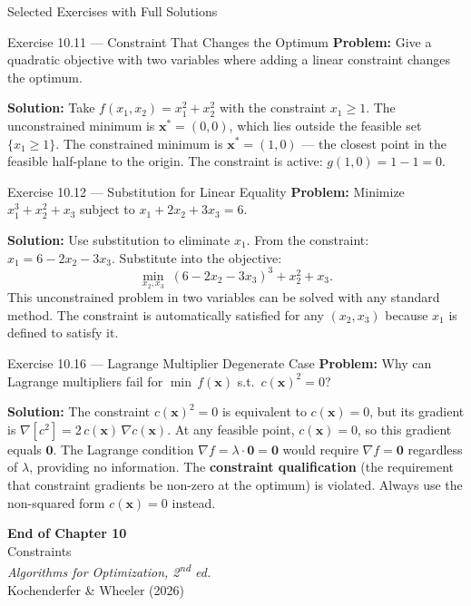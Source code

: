 \documentclass[aspectratio=169,10pt]{beamer}
\newcommand{\bx}{\mathbf{x}}
\begin{document}
\begin{frame}[allowframebreaks]{Selected Exercises with Full Solutions}
  \begin{block}{Exercise 10.11 --- Constraint That Changes the Optimum}
    \textbf{Problem:} Give a quadratic objective with two variables where adding
    a linear constraint changes the optimum.

    \medskip
    \textbf{Solution:}  Take $f(x_1, x_2) = x_1^2 + x_2^2$ with the constraint
    $x_1 \ge 1$.  The unconstrained minimum is $\bx^* = (0, 0)$, which lies
    outside the feasible set $\{x_1 \ge 1\}$.  The constrained minimum is
    $\bx^* = (1, 0)$ --- the closest point in the feasible half-plane to the
    origin.  The constraint is active: $g(1, 0) = 1 - 1 = 0$.
  \end{block}

  \framebreak

  \begin{block}{Exercise 10.12 --- Substitution for Linear Equality}
    \textbf{Problem:} Minimize $x_1^3 + x_2^2 + x_3$ subject to
    $x_1 + 2x_2 + 3x_3 = 6$.

    \medskip
    \textbf{Solution:}  Use substitution to eliminate $x_1$.  From the
    constraint: $x_1 = 6 - 2x_2 - 3x_3$.  Substitute into the objective:
    \[
      \min_{x_2, x_3}\; (6 - 2x_2 - 3x_3)^3 + x_2^2 + x_3.
    \]
    This unconstrained problem in two variables can be solved with any standard
    method.  The constraint is automatically satisfied for any $(x_2, x_3)$
    because $x_1$ is defined to satisfy it.
  \end{block}

  \begin{block}{Exercise 10.16 --- Lagrange Multiplier Degenerate Case}
    \textbf{Problem:} Why can Lagrange multipliers fail for
    $\min\, f(\bx)$ s.t.\ $c(\bx)^2 = 0$?

    \medskip
    \textbf{Solution:}  The constraint $c(\bx)^2 = 0$ is equivalent to
    $c(\bx) = 0$, but its gradient is
    $\nabla[c^2] = 2\,c(\bx)\,\nabla c(\bx)$.  At any feasible point,
    $c(\bx) = 0$, so this gradient equals $\mathbf{0}$.  The Lagrange condition
    $\nabla f = \lambda \cdot \mathbf{0} = \mathbf{0}$ would require $\nabla f = \mathbf{0}$
    regardless of $\lambda$, providing no information.  The \textbf{constraint
    qualification} (the requirement that constraint gradients be non-zero at the
    optimum) is violated.  Always use the non-squared form $c(\bx) = 0$ instead.
  \end{block}

\end{frame}

\begin{frame}{}
  \begin{center}
    \vspace{2em}
    {\Large\textbf{End of Chapter 10}}\\[1em]
    {\large Constraints}\\[2em]
    \textit{Algorithms for Optimization, 2\textsuperscript{nd} ed.}\\
    Kochenderfer \& Wheeler (2026)
  \end{center}
\end{frame}
\end{document}
